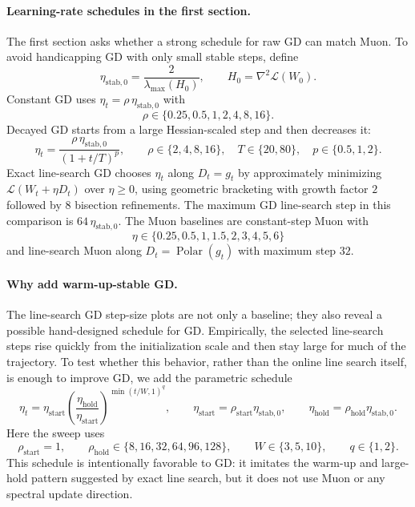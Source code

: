 \documentclass[11pt]{article}
\newcommand{\loss}{\mathcal{L}}
\begin{document}
\paragraph{Learning-rate schedules in the first section.}
The first section asks whether a strong schedule for raw GD can match Muon.
To avoid handicapping GD with only small stable steps, define
\[
    \eta_{\mathrm{stab},0}
    =
    \frac{2}{\lambda_{\max}(H_0)},
    \qquad
    H_0=\nabla^2\loss(W_0).
\]
Constant GD uses $\eta_t=\rho\,\eta_{\mathrm{stab},0}$ with
\[
    \rho\in\{0.25,0.5,1,2,4,8,16\}.
\]
Decayed GD starts from a large Hessian-scaled step and then decreases it:
\[
    \eta_t
    =
    \frac{\rho\,\eta_{\mathrm{stab},0}}{(1+t/T)^p},
    \qquad
    \rho\in\{2,4,8,16\},\quad
    T\in\{20,80\},\quad
    p\in\{0.5,1,2\}.
\]
Exact line-search GD chooses $\eta_t$ along $D_t=g_t$ by approximately
minimizing $\loss(W_t+\eta D_t)$ over $\eta\ge0$, using geometric bracketing
with growth factor $2$ followed by $8$ bisection refinements.  The maximum
GD line-search step in this comparison is $64\,\eta_{\mathrm{stab},0}$.
The Muon baselines are constant-step Muon with
\[
    \eta\in\{0.25,0.5,1,1.5,2,3,4,5,6\}
\]
and line-search Muon along $D_t=\operatorname{Polar}(g_t)$ with maximum step
$32$.

\paragraph{Why add warm-up-stable GD.}
The line-search GD step-size plots are not only a baseline; they also reveal a
possible hand-designed schedule for GD.  Empirically, the selected line-search
steps rise quickly from the initialization scale and then stay large for much
of the trajectory.  To test whether this behavior, rather than the online line
search itself, is enough to improve GD, we add the parametric schedule
\[
    \eta_t
    =
    \eta_{\mathrm{start}}
    \left(
        \frac{\eta_{\mathrm{hold}}}{\eta_{\mathrm{start}}}
    \right)^{\min(t/W,1)^q},
    \qquad
    \eta_{\mathrm{start}}=\rho_{\mathrm{start}}\eta_{\mathrm{stab},0},
    \qquad
    \eta_{\mathrm{hold}}=\rho_{\mathrm{hold}}\eta_{\mathrm{stab},0}.
\]
Here the sweep uses
\[
    \rho_{\mathrm{start}}=1,\qquad
    \rho_{\mathrm{hold}}\in\{8,16,32,64,96,128\},\qquad
    W\in\{3,5,10\},\qquad
    q\in\{1,2\}.
\]
This schedule is intentionally favorable to GD: it imitates the warm-up and
large-hold pattern suggested by exact line search, but it does not use Muon or
any spectral update direction.
\end{document}
